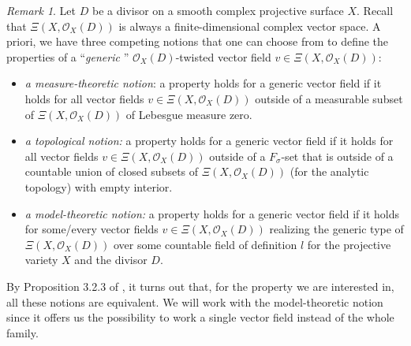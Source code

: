 \documentclass[12pt]{amsart}
\theoremstyle{definition}
\theoremstyle{plain}
\theoremstyle{exampstyle}
\theoremstyle{exampstyle}\newtheorem{thmxbis}{Theorem}
\numberwithin{equation}{section}
\theoremstyle{remark}
\newtheorem{remark}[definition]{Remark}
\begin{document}
\begin{remark} \label{remark-Lebesguemeasure}
Let $D$ be a divisor on a smooth complex projective surface $X$. Recall that $\Xi(X,\mathcal O_X(D))$ is always a finite-dimensional complex vector space. A priori, we have three competing notions that one can choose from to define the properties of a ``{\em generic }'' $\mathcal O_X(D)$-twisted vector field $v \in \Xi(X,\mathcal O_X(D))$: 
\begin{itemize} 
\item \textit{a measure-theoretic notion}: a property holds for a generic vector field if it holds for all vector fields $v \in \Xi(X,\mathcal O_X(D))$ outside of a measurable subset of $\Xi(X,\mathcal O_X(D))$ of Lebesgue measure zero. 

\item \textit{a topological notion: }a property holds for a generic vector field if it holds for all vector fields $v \in \Xi(X,\mathcal O_X(D))$ outside of a $F_\sigma$-set that is outside of a countable union of closed subsets of $\Xi(X,\mathcal O_X(D))$ (for the analytic topology) with empty interior. 

\item \textit{a model-theoretic notion:} a property holds for a generic vector field if it holds for some/every vector fields $v \in \Xi(X,\mathcal O_X(D))$ realizing the generic type of  $\Xi(X,\mathcal O_X(D))$ over some countable field of definition $l$ for the projective variety $X$ and the divisor $D$. 
\end{itemize} 
By Proposition 3.2.3 of \cite{jaoui-ANT}, it turns out that, for the property we are interested in,  all these notions are equivalent. We will work with the model-theoretic notion since it offers us the possibility to work a single vector field instead of the whole family. 
\end{remark} 
\end{document}
